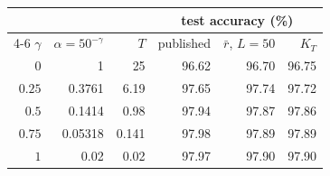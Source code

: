 \begin{tabular}{@{}rrrrrr@{}}
\toprule
& & & \multicolumn{3}{c}{test accuracy (\%)} \\
\cmidrule(lr){4-6}
$\gamma$ & $\alpha=50^{-\gamma}$ & $T$ & published & $\bar r$, $L=50$ & $K_T$ \\
\midrule
$0$ & 1 & 25 & 96.62 & 96.70 & 96.75 \\
$0.25$ & 0.3761 & 6.19 & 97.65 & 97.74 & 97.72 \\
$0.5$ & 0.1414 & 0.98 & 97.94 & 97.87 & 97.86 \\
$0.75$ & 0.05318 & 0.141 & 97.98 & 97.89 & 97.89 \\
$1$ & 0.02 & 0.02 & 97.97 & 97.90 & 97.90 \\
\bottomrule
\end{tabular}
